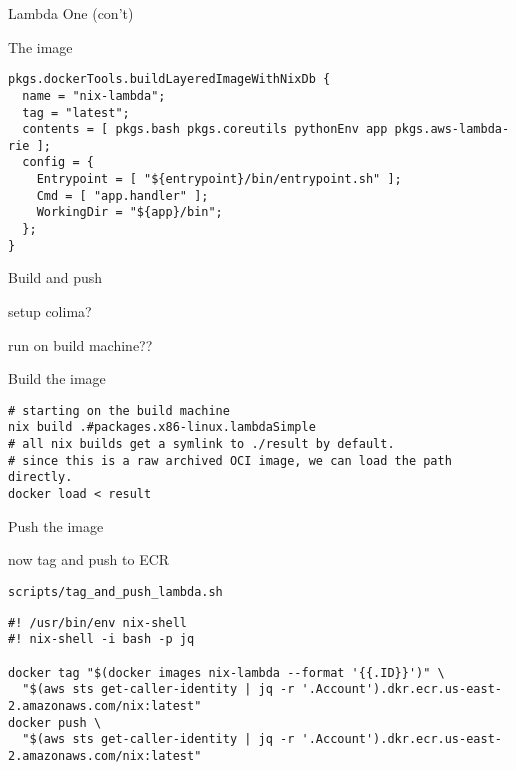 \documentclass[bigger]{beamer}
\begin{document}
\begin{frame}[label={sec:org79f152d},fragile]{Lambda One (con't)}
 \begin{block}{The image}
\tiny
\begin{verbatim}
pkgs.dockerTools.buildLayeredImageWithNixDb {
  name = "nix-lambda";
  tag = "latest";
  contents = [ pkgs.bash pkgs.coreutils pythonEnv app pkgs.aws-lambda-rie ];
  config = {
    Entrypoint = [ "${entrypoint}/bin/entrypoint.sh" ];
    Cmd = [ "app.handler" ];
    WorkingDir = "${app}/bin";
  };
}
\end{verbatim}
\end{block}
\end{frame}
\begin{frame}[label={sec:orgf9c3f2d},fragile]{Build and push}
 \begin{block}{setup colima?}
\end{block}
\begin{block}{run on build machine??}
\end{block}
\begin{exampleblock}{Build the image}
\begin{verbatim}
# starting on the build machine
nix build .#packages.x86-linux.lambdaSimple
# all nix builds get a symlink to ./result by default.
# since this is a raw archived OCI image, we can load the path directly.
docker load < result
\end{verbatim}
\end{exampleblock}
\end{frame}
\begin{frame}[label={sec:orgd641c6e},fragile]{Push the image}
 \begin{block}{now tag and push to ECR}
\begin{verbatim}
scripts/tag_and_push_lambda.sh
\end{verbatim}
\tiny
\begin{verbatim}
#! /usr/bin/env nix-shell
#! nix-shell -i bash -p jq

docker tag "$(docker images nix-lambda --format '{{.ID}}')" \
  "$(aws sts get-caller-identity | jq -r '.Account').dkr.ecr.us-east-2.amazonaws.com/nix:latest"
docker push \
  "$(aws sts get-caller-identity | jq -r '.Account').dkr.ecr.us-east-2.amazonaws.com/nix:latest"
\end{verbatim}
\end{block}
\end{frame}
\end{document}
